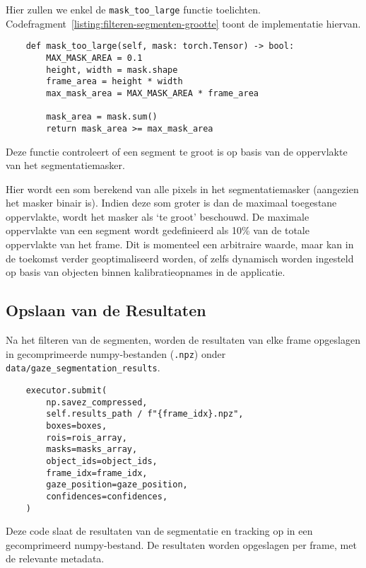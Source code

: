 Hier zullen we enkel de \texttt{mask\_too\_large} functie toelichten.\\
Codefragment~\ref{listing:filteren-segmenten-grootte} toont de implementatie hiervan.

\begin{listing}[H]
  \begin{verbatim}
    def mask_too_large(self, mask: torch.Tensor) -> bool:
        MAX_MASK_AREA = 0.1
        height, width = mask.shape
        frame_area = height * width
        max_mask_area = MAX_MASK_AREA * frame_area

        mask_area = mask.sum()
        return mask_area >= max_mask_area
    \end{verbatim}
  \caption[Filteren van segmenten op basis van grootte]{
    \label{listing:filteren-segmenten-grootte}  
    Deze functie controleert of een segment te groot is op basis van de oppervlakte van het segmentatiemasker. 
  }
\end{listing}

Hier wordt een som berekend van alle pixels in het segmentatiemasker (aangezien het masker binair is).
Indien deze som groter is dan de maximaal toegestane oppervlakte, wordt het masker als `te groot' beschouwd.
De maximale oppervlakte van een segment wordt gedefinieerd als 10\% van de totale oppervlakte van het frame.
Dit is momenteel een arbitraire waarde, maar kan in de toekomst verder geoptimaliseerd worden, of zelfs 
dynamisch worden ingesteld op basis van objecten binnen kalibratieopnames in de applicatie.

\subsection{Opslaan van de Resultaten}

Na het filteren van de segmenten, worden de resultaten van elke frame opgeslagen in gecomprimeerde numpy-bestanden 
(\texttt{.npz}) onder\\ \texttt{data/gaze\_segmentation\_results}.

\begin{listing}[H]
  \begin{verbatim}
    executor.submit(
        np.savez_compressed,
        self.results_path / f"{frame_idx}.npz",
        boxes=boxes,
        rois=rois_array,
        masks=masks_array,
        object_ids=object_ids,
        frame_idx=frame_idx,
        gaze_position=gaze_position,
        confidences=confidences,
    )
    \end{verbatim}
  \caption[Opslaan van segmentatie-resultaten]{
    \label{listing:opslaan-segmentatie-resultaten}
    Deze code slaat de resultaten van de segmentatie en tracking op in een gecomprimeerd numpy-bestand.
    De resultaten worden opgeslagen per frame, met de relevante metadata.
  }
\end{listing}


